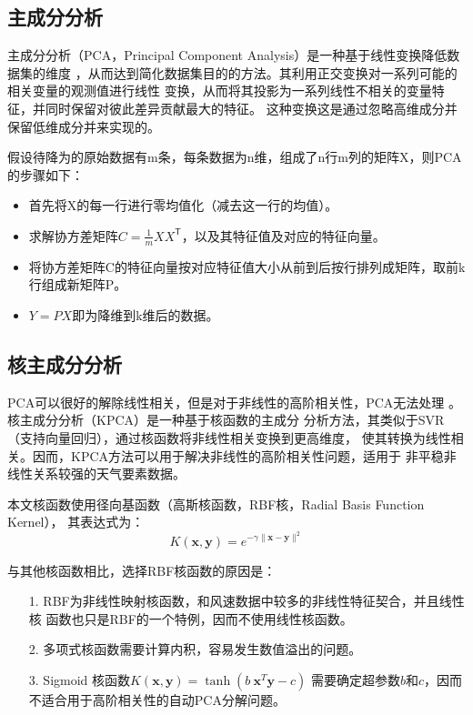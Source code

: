 \documentclass[AutoFakeBold]{LZUThesis}
\begin{document}
\subsection{主成分分析}
主成分分析（PCA，Principal Component Analysis）是一种基于线性变换降低数据集的维度
，从而达到简化数据集目的的方法。其利用正交变换对一系列可能的相关变量的观测值进行线性
变换，从而将其投影为一系列线性不相关的变量特征，并同时保留对彼此差异贡献最大的特征。
这种变换这是通过忽略高维成分并保留低维成分并来实现的。

假设待降为的原始数据有m条，每条数据为n维，组成了n行m列的矩阵X，则PCA的步骤如下：

\begin{itemize}
    \item 首先将X的每一行进行零均值化（减去这一行的均值）。
    \item 求解协方差矩阵$C=\frac{1}{m}XX^\mathsf{T}$，以及其特征值及对应的特征向量。
    \item 将协方差矩阵C的特征向量按对应特征值大小从前到后按行排列成矩阵，取前k行组成新矩阵P。
    \item $Y=PX$即为降维到k维后的数据。
\end{itemize}

\subsection{核主成分分析}
PCA可以很好的解除线性相关，但是对于非线性的高阶相关性，PCA无法处理
\cite{jolliffe2016principal}。核主成分分析（KPCA）是一种基于核函数的主成分
分析方法，其类似于SVR（支持向量回归），通过核函数将非线性相关变换到更高维度，
使其转换为线性相关。因而，KPCA方法可以用于解决非线性的高阶相关性问题，适用于
非平稳非线性关系较强的天气要素数据。

本文核函数使用径向基函数（高斯核函数，RBF核，Radial Basis Function Kernel），
其表达式为：
$$K(\mathbf x,\mathbf y)=e^{-\gamma\|\mathbf x-\mathbf y\|^2}$$

与其他核函数相比，选择RBF核函数的原因是：

\begin{itemize}
\item[1. ] RBF为非线性映射核函数，和风速数据中较多的非线性特征契合，并且线性核
函数也只是RBF的一个特例，因而不使用线性核函数。
\item[2. ] 多项式核函数需要计算内积，容易发生数值溢出的问题。
\item[3. ] Sigmoid 核函数$K(\mathbf x,\mathbf y)=\tanh(b\:\mathbf x^T\mathbf y-c)$
需要确定超参数$b$和$c$，因而不适合用于高阶相关性的自动PCA分解问题。 
\end{itemize}
\end{document}
